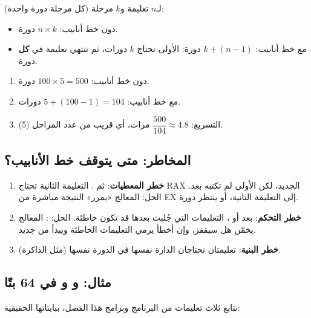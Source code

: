 \begin{tarif}
    لـ$n$ تعليمة و$k$ مرحلة (كل مرحلة دورة واحدة):
    \begin{itemize}
        \item دون خط أنابيب: $n \times k$ دورة.
        \item مع خط أنابيب: $k + (n - 1)$ دورة: الأولى تحتاج $k$ دورات، ثم تنتهي تعليمة في \textbf{كل} دورة.
    \end{itemize}
\end{tarif}

\begin{khatwa}
    \begin{enumerate}
        \item دون خط أنابيب: $100 \times 5 = 500$ دورة.
        \item مع خط أنابيب: $5 + (100 - 1) = 104$ دورات.
        \item التسريع: $\dfrac{500}{104} \approx 4.8$ مرات، أي قريب من عدد المراحل (5).
    \end{enumerate}
\end{khatwa}

\subsection{المخاطر: متى يتوقف خط الأنابيب؟}
\begin{enumerate}
    \item \textbf{خطر المعطيات}:  ثم . التعليمة الثانية تحتاج \textenglish{RAX} الجديد،
          لكن الأولى لم تكتبه بعد. الحل: المعالج «يمرر» النتيجة مباشرة من \textenglish{EX} إلى التعليمة الثانية، أو ينتظر دورة.
    \item \textbf{خطر التحكم}: بعد  أو ، التعليمات التي جُلبت بعدها قد تكون خاطئة. الحل:
          : المعالج يخمّن هل سيقفز، وإن أخطأ
          يرمي التعليمات الخاطئة ويبدأ من جديد.
    \item \textbf{خطر البنية}: تعليمتان تحتاجان الدارة نفسها في الدورة نفسها (مثل الذاكرة).
\end{enumerate}

\subsection{مثال:  و و في 64 بتًا}
نتابع ثلاث تعليمات من البرنامج  وبرامج هذا الفصل، ببايتاتها الحقيقية:


